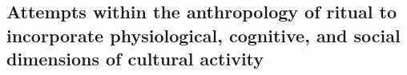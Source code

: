\begin{CJK}{UTF8}{gbsn}




\subsection{Attempts within the anthropology of ritual to incorporate physiological, cognitive, and social dimensions of cultural activity}


\end{CJK}
